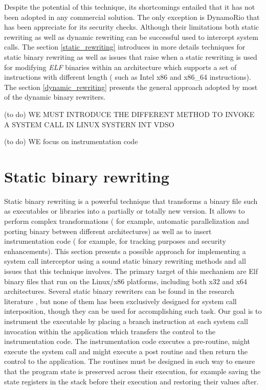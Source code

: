 Despite the potential of this technique, its shortcomings entailed that it has not been adopted in any commercial solution. The only exception is DynamoRio that has been appreciate for its security checks. Although their limitations both static rewriting as well as dynamic rewriting can be successful used to intercept system calls. The section \ref{static_rewriting} introduces in more details techniques for static binary rewriting as well as issues that raise when a static rewriting is used for modifying \emph{ELF} binaries within an architecture which supports  a set of instructions with different length ( such as Intel x86 and x86\_64 instructions). The section \ref{dynamic_rewriting} presents the general approach adopted by most of the dynamic binary rewriters. 

(to do) WE MUST INTRODUCE THE DIFFERENT METHOD TO INVOKE A SYSTEM CALL IN LINUX			
SYSTERN 
INT 
VDSO 

(to do) WE focus on  instrumentation code

\section{Static binary rewriting}

Static binary rewriting  is a powerful technique that transforms a binary file such as executables or libraries into a partially or totally new version. It allows to perform complex transformations ( for example, automatic parallelization and porting binary between different architectures) as well as to insert instrumentation code ( for example, for tracking purposes and security enhancements). This section presents a possible approach for implementing a system call interceptor using a sound static binary rewriting methods and all issues that this technique involves.  The primary target of this mechanism are Elf binary files that run on the Linux/x86 platforms, including both x32 and x64 architectures. Several static binary rewriters can be found in the research literature \cite{PEBIL, BIRD, SECONDWRITER, REINS}, but none of them has been exclusively designed for system call interposition, though they can be used for accomplishing such task. Our goal is to instrument the executable by placing a branch instruction at each system call invocation within the application which transfers the control to the instrumentation code. The instrumentation code executes a pre-routine, might execute the system call and might execute a post routine and then return the control to the application. The routines must be designed in such way to ensure that the program state is preserved across their execution, for example saving the state registers in the stack before their execution and restoring their values after. 
  
